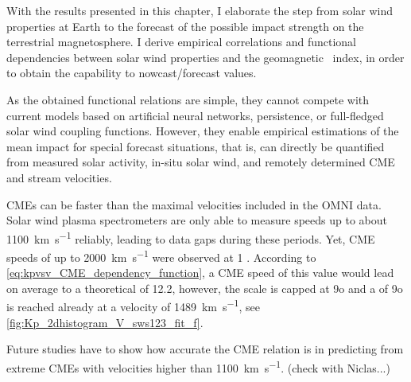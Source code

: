 With the results presented in this chapter, I elaborate the step from solar wind properties at Earth to the forecast of the possible impact strength on the terrestrial magnetosphere. I derive empirical correlations and functional dependencies between solar wind properties and the geomagnetic \Kp~index, in order to obtain the capability to nowcast/forecast \Kp{} values.

As the obtained functional relations are simple, they cannot compete with current models based on artificial neural networks, \Kp{} persistence, or full-fledged solar wind coupling functions. However, they enable empirical estimations of the mean \Kp{} impact for special forecast situations, that is, \Kp{} can directly be quantified from measured solar activity, in-situ solar wind, and remotely determined CME and stream velocities.

CMEs can be faster than the maximal velocities included in the OMNI data. Solar wind plasma spectrometers are only able to measure speeds up to about \SI{1100}{\km\per\s} reliably, leading to data gaps during these periods. Yet, CME speeds of up to \SI{2000}{\km\per\s} were observed at \SI{1}{\au} \citep{Russell2013}. According to \autoref{eq:kpvsv_CME_dependency_function}, a CME speed of this value would lead on average to a theoretical \Kp{} of 12.2, however, the \Kp{} scale is capped at 9o and a \Kp{} of 9o is reached already at a velocity of \SI{1489}{\km\per\s}, see \autoref{fig:Kp_2dhistogram_V_sws123_fit_f}.
\begin{figure}
\end{figure}
Future studies have to show how accurate the CME relation is in predicting \Kp{} from extreme CMEs with velocities higher than \SI{1100}{\km\per\s}. (check with Niclas...)\\

